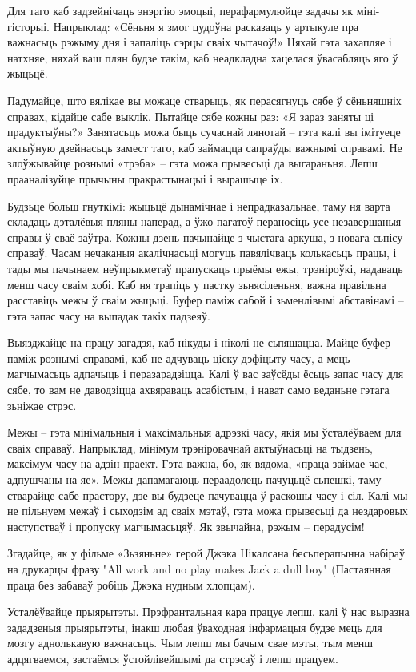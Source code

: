 Для таго каб задзейнічаць энэргію эмоцыі, перафармулюйце задачы як міні-гісторыі. Напрыклад: «Сёньня я змог цудоўна расказаць у артыкуле пра важнасьць рэжыму дня і запаліць сэрцы сваіх чытачоў!» Няхай гэта захапляе і натхняе, няхай ваш плян будзе такім, каб неадкладна хацелася ўвасабляць яго ў жыцьцё.

Падумайце, што вялікае вы можаце стварыць, як перасягнуць сябе ў сёньняшніх справах, кідайце сабе выклік. Пытайце сябе кожны раз: «Я зараз заняты ці прадуктыўны?» Занятасьць можа быць сучаснай лянотай – гэта калі вы імітуеце актыўную дзейнасьць замест таго, каб займацца сапраўды важнымі справамі. Не злоўжывайце рознымі «трэба» – гэта можа прывесьці да выгараньня. Лепш прааналізуйце прычыны пракрастынацыі і вырашыце іх.

Будзьце больш гнуткімі: жыцьцё дынамічнае і непрадказальнае, таму ня варта складаць дэталёвыя пляны наперад, а ўжо пагатоў пераносіць усе незавершаныя справы ў сваё заўтра. Кожны дзень пачынайце з чыстага аркуша, з новага сьпісу справаў. Часам нечаканыя акалічнасьці могуць павялічваць колькасьць працы, і тады мы пачынаем неўпрыкметаў прапускаць прыёмы ежы, трэніроўкі, надаваць менш часу сваім хобі. Каб ня трапіць у пастку зьнясіленьня, важна правільна расставіць межы ў сваім жыцьці. Буфер паміж сабой і зьменлівымі абставінамі – гэта запас часу на выпадак такіх падзеяў. 

Выязджайце на працу загадзя, каб нікуды і ніколі не сьпяшацца. Майце буфер паміж рознымі справамі, каб не адчуваць ціску дэфіцыту часу, а мець магчымасьць адпачыць і перазарадзіцца. Калі ў вас заўсёды ёсьць запас часу для сябе, то вам не даводзіцца ахвяраваць асабістым, і нават само веданьне гэтага зьніжае стрэс.

Межы – гэта мінімальныя і максімальныя адрэзкі часу, якія мы ўсталёўваем для сваіх справаў. Напрыклад, мінімум трэніровачнай актыўнасьці на тыдзень, максімум часу на адзін праект. Гэта важна, бо, як вядома, «праца займае час, адпушчаны на яе». Межы дапамагаюць пераадолець пачуцьцё сьпешкі, таму стварайце сабе прастору, дзе вы будзеце пачувацца ў раскошы часу і сіл. Калі мы не пільнуем межаў і сыходзім ад сваіх мэтаў, гэта можа прывесьці да нездаровых наступстваў і пропуску магчымасьцяў. Як звычайна, рэжым – перадусім!

Згадайце, як у фільме «Зьзяньне» герой Джэка Нікалсана бесьперапынна набіраў на друкарцы фразу "All work and no play makes Jack a dull boy" (Пастаянная праца без забаваў робіць Джэка нудным хлопцам).

Усталёўвайце прыярытэты. Прэфрантальная кара працуе лепш, калі ў нас выразна зададзеныя прыярытэты, інакш любая ўваходная інфармацыя будзе мець для мозгу аднолькавую важнасьць. Чым лепш мы бачым свае мэты, тым менш адцягваемся, застаёмся ўстойлівейшымі да стрэсаў і лепш працуем.

